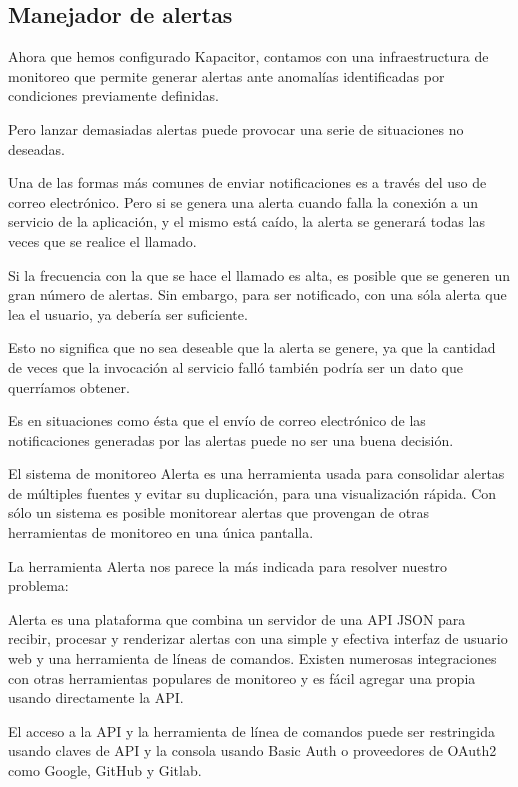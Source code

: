 \subsection{Manejador de alertas}
\label{manejador-alertas}

Ahora que hemos configurado Kapacitor, contamos con una infraestructura de monitoreo que permite generar alertas ante anomalías identificadas por condiciones previamente definidas.

Pero lanzar demasiadas alertas puede provocar una serie de situaciones no deseadas.

Una de las formas más comunes de enviar notificaciones es a través del uso de correo electrónico. Pero si se genera una alerta cuando falla la conexión a un servicio de la aplicación, y el mismo está caído, la alerta se generará todas las veces que se realice el llamado.

Si la frecuencia con la que se hace el llamado es alta, es posible que se generen un gran número de alertas. Sin embargo, para ser notificado, con una sóla alerta que lea el usuario, ya debería ser suficiente.

Esto no significa que no sea deseable que la alerta se genere, ya que la cantidad de veces que la invocación al servicio falló también podría ser un dato que querríamos obtener.

Es en situaciones como ésta que el envío de correo electrónico de las notificaciones generadas por las alertas puede no ser una buena decisión.

El sistema de monitoreo Alerta es una herramienta usada para consolidar alertas de múltiples fuentes y evitar su duplicación, para una visualización rápida. Con sólo un sistema es posible monitorear alertas que provengan de otras herramientas de monitoreo en una única pantalla.

La herramienta Alerta nos parece la más indicada para resolver nuestro problema:

Alerta es una plataforma que combina un servidor de una API JSON para recibir, procesar y renderizar alertas con una simple y efectiva interfaz de usuario web y una herramienta de líneas de comandos. Existen numerosas integraciones con otras herramientas populares de monitoreo y es fácil agregar una propia usando directamente la API.

El acceso a la API y la herramienta de línea de comandos puede ser restringida usando claves de API y la consola usando Basic Auth o proveedores de OAuth2 como Google, GitHub y Gitlab.


